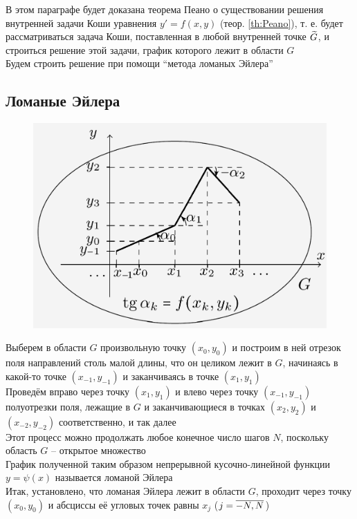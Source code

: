 В этом параграфе будет доказана теорема Пеано о существовании решения внутренней задачи Коши уравнения  $ y' = f(x, y) $ (теор. \ref{th:Peano}), т. е. будет рассматриваться задача Коши, поставленная в любой внутренней точке $ \widetilde{G} $, и строиться решение этой задачи, график которого лежит в области $ G $ \\
Будем строить решение при помощи ``метода ломаных Эйлера''

\subsection{Ломаные Эйлера}

\begin{figure}
	\centering
    \includegraphics[scale=0.27]{euler-polylines}
\end{figure}

Выберем в области $ G $ произвольную точку $ (x_0, y_0) $ и построим в ней отрезок поля направлений столь малой длины, что он целиком лежит в $ G $, начинаясь в какой-то точке $ (x_{-1}, y_{-1}) $ и заканчиваясь в точке $ (x_1, y_1) $ \\
Проведём вправо через точку $ (x_1, y_1) $ и влево через точку $ (x_{-1}, y_{-1}) $ полуотрезки поля, лежащие в $ G $ и заканчивающиеся в точках $ (x_2, y_2) $ и $ (x_{-2}, y_{-2}) $ соответственно, и так далее \\
Этот процесс можно продолжать любое конечное число шагов $ N $, поскольку область $ G $ -- открытое множество \\
График полученной таким образом непрерывной кусочно-линейной функции $ y = \psi(x) $ называется ломаной Эйлера \\
Итак, установлено, что ломаная Эйлера лежит в области $ G $, проходит через точку $ (x_0, y_0) $ и абсциссы её угловых точек равны $ x_j $ ($ j = \overline{-N, N} $)

